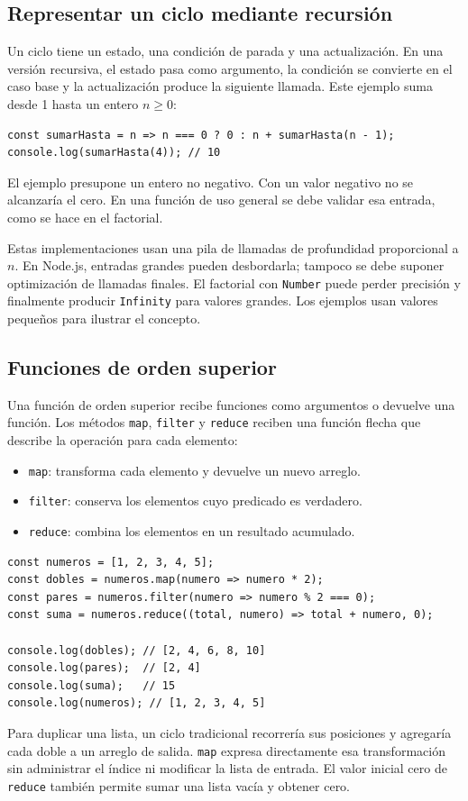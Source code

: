 \documentclass[11pt,a4paper]{article}
\begin{document}
\subsection{Representar un ciclo mediante recursión}
Un ciclo tiene un estado, una condición de parada y una actualización.
En una versión recursiva, el estado pasa como argumento, la condición se
convierte en el caso base y la actualización produce la siguiente llamada.
Este ejemplo suma desde 1 hasta un entero $n\geq0$:
\begin{lstlisting}
const sumarHasta = n => n === 0 ? 0 : n + sumarHasta(n - 1);
console.log(sumarHasta(4)); // 10
\end{lstlisting}
El ejemplo presupone un entero no negativo. Con un valor negativo no se
alcanzaría el cero. En una función de uso general se debe validar esa entrada,
como se hace en el factorial.

Estas implementaciones usan una pila de llamadas de profundidad proporcional
a $n$. En Node.js, entradas grandes pueden desbordarla; tampoco se debe
suponer optimización de llamadas finales. El factorial con \texttt{Number}
puede perder precisión y finalmente producir \texttt{Infinity} para valores
grandes. Los ejemplos usan valores pequeños para ilustrar el concepto.

\newpage
\subsection{Funciones de orden superior}
Una función de orden superior recibe funciones como argumentos o devuelve una
función. Los métodos \texttt{map}, \texttt{filter} y \texttt{reduce} reciben
una función flecha que describe la operación para cada elemento:
\begin{itemize}
    \item \texttt{map}: transforma cada elemento y devuelve un nuevo arreglo.
    \item \texttt{filter}: conserva los elementos cuyo predicado es verdadero.
    \item \texttt{reduce}: combina los elementos en un resultado acumulado.
\end{itemize}
\begin{lstlisting}
const numeros = [1, 2, 3, 4, 5];
const dobles = numeros.map(numero => numero * 2);
const pares = numeros.filter(numero => numero % 2 === 0);
const suma = numeros.reduce((total, numero) => total + numero, 0);

console.log(dobles); // [2, 4, 6, 8, 10]
console.log(pares);  // [2, 4]
console.log(suma);   // 15
console.log(numeros); // [1, 2, 3, 4, 5]
\end{lstlisting}
Para duplicar una lista, un ciclo tradicional recorrería sus posiciones y
agregaría cada doble a un arreglo de salida. \texttt{map} expresa directamente
esa transformación sin administrar el índice ni modificar la lista de entrada.
El valor inicial cero de \texttt{reduce} también permite sumar una lista vacía
y obtener cero.
\end{document}
